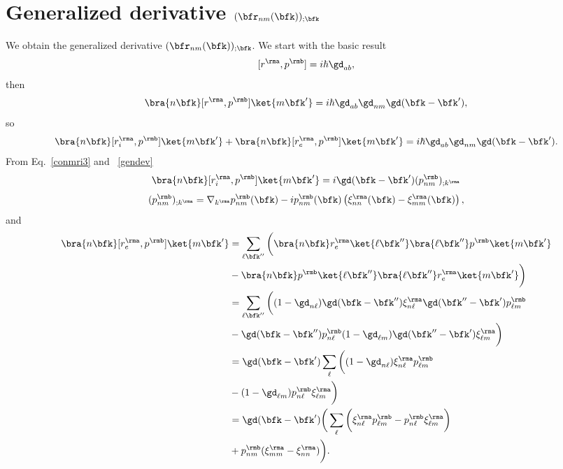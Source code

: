 \section{Generalized derivative $(\bfr_{nm}(\bfk))_{;\bfk}$}\label{gder}

We obtain the generalized derivative $(\bfr_{nm}(\bfk))_{;\bfk}$.
We start with the basic result
\begin{equation}\label{a_hrdab}
[r^{\rma},p^{\rmb}]=i\hbar\gd_{ab}
,
\end{equation} 
then
\begin{equation}\label{a_hrdab2}
\bra{n\bfk}[r^{\rma},p^{\rmb}]\ket{m\bfk'}=i\hbar\gd_{ab}\gd_{nm}\gd(\bfk-\bfk')
,
\end{equation}
so
\begin{equation}\label{a_hrdab3}
\bra{n\bfk}[r^{\rma}_i,p^{\rmb}]\ket{m\bfk'}
+
\bra{n\bfk}[r^{\rma}_e,p^{\rmb}]\ket{m\bfk'}
=i\hbar\gd_{ab}\gd_{nm}\gd(\bfk-\bfk')
.
\end{equation}
From Eq.~\eqref{conmri3} and ~\eqref{gendev}
\begin{equation}\label{a_rip}
\bra{n\bfk}[r^{\rma}_i,p^{\rmb}]\ket{m\bfk'}
=i\gd(\bfk-\bfk')(p^{\rmb}_{nm})_{;k^{\rma}}
\end{equation}
\begin{equation}\label{a_ripn}
(p^{\rmb}_{nm})_{;k^{\rma}}=
\nabla_{k^{\rma}}
p^{\rmb}_{n m}(\bfk)
-
i
p^{\rmb}_{nm}(\bfk)
\left(
\xi^{\rma}_{nn}(\bfk)
-
\xi^{\rma}_{mm}(\bfk)
\right)
,
\end{equation}
and
\begin{align}\label{a_rep}
\bra{n\bfk}[r^{\rma}_e,p^{\rmb}]\ket{m\bfk'}&=
\sum_{\ell\bfk''}
\bigg(
\bra{n\bfk}r^{\rma}_e\ket{\ell\bfk''}\bra{\ell\bfk''}p^{\rmb}\ket{m\bfk'}
\nonumber \\
&
-
\bra{n\bfk}p^{\rmb}\ket{\ell\bfk''}\bra{\ell\bfk''}r^{\rma}_e\ket{m\bfk'}
\bigg)
\nonumber \\
&=
\sum_{\ell\bfk''}
\bigg(
(1-\gd_{n\ell})\gd(\bfk-\bfk'')\xi^{\rma}_{n\ell}
\gd(\bfk''-\bfk')p^{\rmb}_{\ell m}
\nonumber \\
&-
\gd(\bfk-\bfk'')p^{\rmb}_{n\ell}
(1-\gd_{\ell m})\gd(\bfk''-\bfk')\xi^{\rma}_{\ell m}
\bigg)
\nonumber \\
&=
\gd(\bfk-\bfk')
\sum_{\ell}
\bigg(
(1-\gd_{n\ell})
\xi^{\rma}_{n\ell}
p^{\rmb}_{\ell m}
\nonumber \\
&-
(1-\gd_{\ell m})
p^{\rmb}_{n\ell}
\xi^{\rma}_{\ell m}
\bigg)
\nonumber \\
&=
\gd(\bfk-\bfk')
\bigg(
\sum_{\ell}
\bigg(
\xi^{\rma}_{n\ell}
p^{\rmb}_{\ell m}
-
p^{\rmb}_{n\ell}
\xi^{\rma}_{\ell m}
\bigg)
\nonumber \\
&+
p^{\rmb}_{nm}(\xi^{\rma}_{mm}
-
\xi^{\rma}_{nn}
)
\bigg)
.
\end{align}

